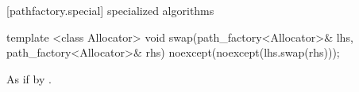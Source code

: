 [pathfactory.special] { specialized algorithms}

\begin{itemdecl}
	template <class Allocator>
	void swap(path_factory<Allocator>& lhs, path_factory<Allocator>& rhs)
	  noexcept(noexcept(lhs.swap(rhs)));
\end{itemdecl}
\begin{itemdescr}
	\pnum
	\effects
	As if by .
\end{itemdescr}

